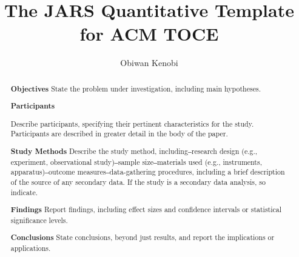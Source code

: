 \documentclass[acmsmall]{acmart}
\begin{document}
\title[JARS Quantitative Template for ACM TOCE]{The JARS Quantitative Template for ACM TOCE}

\author{Obiwan Kenobi}


\renewcommand{\shortauthors}{You et al.}

\newcommand{\AbstractCategory}[1]{%
  \par\addvspace{.5\baselineskip}%
  \noindent\textbf{#1}\quad\ignorespaces
}

%
\begin{abstract}
\AbstractCategory{Objectives}State the problem under investigation, including main hypotheses.


\AbstractCategory{Participants}
Describe participants, specifying their pertinent characteristics for the study. Participants are described in greater detail in the body of the paper.

\AbstractCategory{Study Methods} Describe the study method, including‒research design (e.g., experiment, observational study)‒sample size‒materials used (e.g., instruments, apparatus)‒outcome measures‒data-gathering procedures, including a brief description of the source of any secondary data. If the study is a secondary data analysis, so indicate.

\AbstractCategory{Findings} Report findings, including effect sizes and confidence intervals or statistical significance levels.

\AbstractCategory{Conclusions} State conclusions, beyond just results, and report the implications or applications.

\end{abstract}



%
\end{document}
